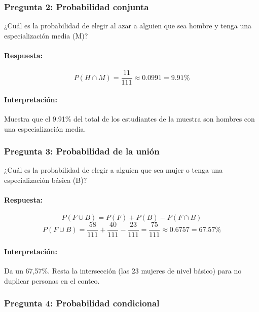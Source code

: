 \subsubsection{Pregunta 2: Probabilidad conjunta}

¿Cuál es la probabilidad de elegir al azar a alguien que sea hombre y tenga una especialización
media (M)?

\paragraph{Respuesta:} 
\[ P(H \cap M) = \frac{11}{111} \approx 0.0991 = 9.91\% \]

\paragraph{Interpretación:} Muestra que el 9.91\% del total de los estudiantes de la
muestra son hombres con una especialización media.


\subsubsection{Pregunta 3: Probabilidad de la unión}

¿Cuál es la probabilidad de elegir a alguien que sea mujer o tenga una especialización básica (B)?

\paragraph{Respuesta:} 
\[ P(F \cup B) = P(F) + P(B) - P(F \cap B) \]
\[ P(F \cup B) = \frac{58}{111} + \frac{40}{111} - \frac{23}{111} = \frac{75}{111} \approx 0.6757 = 67.57\% \]

\paragraph{Interpretación:} Da un 67,57\%. Resta la intersección (las 23 mujeres de nivel básico)
para no duplicar personas en el conteo.


\subsubsection{Pregunta 4: Probabilidad condicional}

